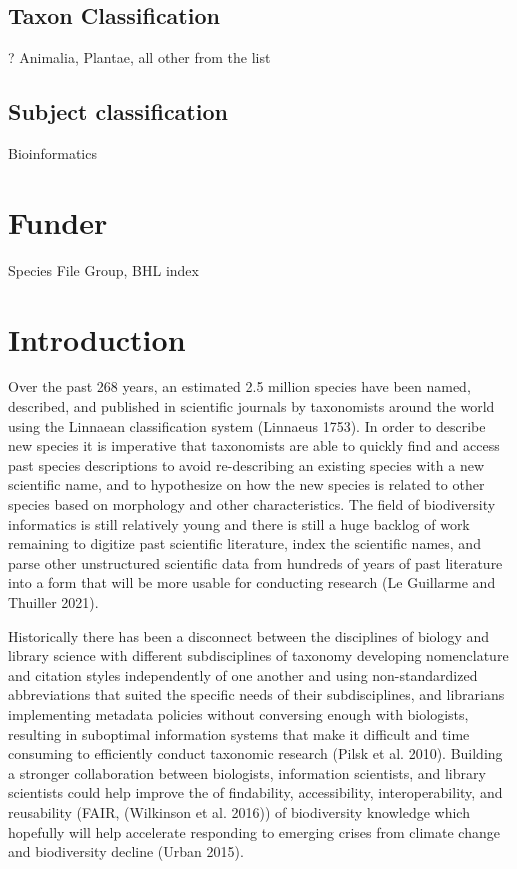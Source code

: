 \documentclass[
]{article}
\begin{document}
\hypertarget{taxon-classification}{%
\subsection{Taxon Classification}\label{taxon-classification}}

? Animalia, Plantae, all other from the list

\hypertarget{subject-classification}{%
\subsection{Subject classification}\label{subject-classification}}

Bioinformatics

\hypertarget{funder}{%
\section{Funder}\label{funder}}

Species File Group, BHL index

\hypertarget{introduction}{%
\section{Introduction}\label{introduction}}

Over the past 268 years, an estimated 2.5 million species have been
named, described, and published in scientific journals by taxonomists
around the world using the Linnaean classification system (Linnaeus
1753). In order to describe new species it is imperative that
taxonomists are able to quickly find and access past species
descriptions to avoid re-describing an existing species with a new
scientific name, and to hypothesize on how the new species is related to
other species based on morphology and other characteristics. The field
of biodiversity informatics is still relatively young and there is still
a huge backlog of work remaining to digitize past scientific literature,
index the scientific names, and parse other unstructured scientific data
from hundreds of years of past literature into a form that will be more
usable for conducting research (Le Guillarme and Thuiller 2021).

Historically there has been a disconnect between the disciplines of
biology and library science with different subdisciplines of taxonomy
developing nomenclature and citation styles independently of one another
and using non-standardized abbreviations that suited the specific needs
of their subdisciplines, and librarians implementing metadata policies
without conversing enough with biologists, resulting in suboptimal
information systems that make it difficult and time consuming to
efficiently conduct taxonomic research (Pilsk et al. 2010). Building a
stronger collaboration between biologists, information scientists, and
library scientists could help improve the of findability, accessibility,
interoperability, and reusability (FAIR, (Wilkinson et al. 2016)) of
biodiversity knowledge which hopefully will help accelerate responding
to emerging crises from climate change and biodiversity decline (Urban
2015).
\end{document}
